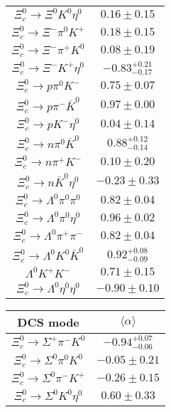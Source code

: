 \begin{table}
{\begin{tabular}{|c|c|}
			$\Xi_{c}^{0} \to  \Xi^{0} K^{0} \eta^{0} $ & $       0.16 \pm       0.15 $ \\
			$\Xi_{c}^{0} \to  \Xi^{-} \pi^{0} K^{+} $ & $       0.18 \pm       0.15 $ \\
			$\Xi_{c}^{0} \to \Xi^{-} \pi^{+} K^{0} $ & $       0.08 \pm       0.19 $ \\
			$\Xi_{c}^{0} \to  \Xi^{-} K^{+} \eta^{0} $ & $      -0.83 ^{+0.21}_{-0.17} $ \\
			$\Xi_{c}^{0} \to  p \pi^{0} K^{-} $ & $       0.75 \pm       0.07 $ \\
			$\Xi_{c}^{0} \to  p \pi^{-} \bar{K}^{0} $ & $       0.97 \pm       0.00 $ \\
			$\Xi_{c}^{0} \to  p K^{-} \eta^{0} $ & $       0.04 \pm       0.14 $ \\
			$\Xi_{c}^{0} \to  n \pi^{0} \bar{K}^{0} $ & $       0.88 ^{+ 0.12}_{-0.14} $ \\
			$\Xi_{c}^{0} \to  n \pi^{+} K^{-} $ & $       0.10 \pm       0.20 $ \\
			$\Xi_{c}^{0} \to  n \bar{K}^{0} \eta^{0} $ & $      -0.23 \pm       0.33 $ \\
			$\Xi_{c}^{0} \to  \Lambda^{0} \pi^{0} \pi^{0} $ & $       0.82 \pm       0.04 $ \\
			$\Xi_{c}^{0} \to  \Lambda^{0} \pi^{0} \eta^{0} $ & $       0.96 \pm       0.02 $ \\
			$\Xi_{c}^{0} \to  \Lambda^{0} \pi^{+} \pi^{-} $ & $       0.82 \pm       0.04 $ \\
			$\Xi_{c}^{0} \to  \Lambda^{0} K^{0} \bar{K}^{0} $ & $       0.92 ^{+0.08}_{- 0.09} $ \\
			$ \Lambda^{0} K^{+} K^{-} $ & $       0.71 \pm       0.15 $ \\
			$\Xi_{c}^{0} \to  \Lambda^{0} \eta^{0} \eta^{0} $ & $      -0.90 \pm       0.10 $ \\
			\hline
		\end{tabular}
		\begin{tabular}{|c|c|}
			\hline
			DCS mode& $\langle \alpha \rangle$\\
			\hline
			$\Xi_{c}^{0} \to  \Sigma^{+} \pi^{-} K^{0} $ & $      -0.94 ^{+0.07}_{-0.06} $ \\
			$\Xi_{c}^{0} \to  \Sigma^{0} \pi^{0} K^{0} $ & $      -0.05 \pm       0.21 $ \\
			$\Xi_{c}^{0} \to  \Sigma^{0} \pi^{-} K^{+} $ & $      -0.26 \pm       0.15 $ \\
			$\Xi_{c}^{0} \to  \Sigma^{0} K^{0} \eta^{0} $ & $       0.60 \pm       0.33 $ \\

\end{tabular}}
\end{table}
